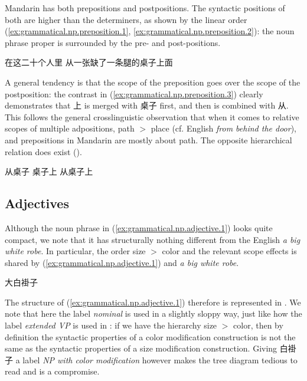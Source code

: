 \documentclass[UTF8, a4paper, oneside, scheme=plain, 12pt]{ctexrep}
\newcommand*{\textgt}{$>$ }
\newcommand*{\term}[1]{\emph{#1}}
\newcommand{\form}[1]{\emph{#1}}
\begin{document}
Mandarin has both prepositions and postpositions.
The syntactic positions of both are higher than the determiners,
as shown by the linear order
(\ref{ex:grammatical.np.preposition.1},
\ref{ex:grammatical.np.preposition.2}):
the noun phrase proper is surrounded by the pre- and post-positions.

\begin{exe}
    \ex\label{ex:grammatical.np.preposition.1} 在这二十个人里
    \ex\label{ex:grammatical.np.preposition.2} 从一张缺了一条腿的桌子上面
\end{exe}

A general tendency is that the scope of the preposition goes over the scope of the postposition:
the contrast in (\ref{ex:grammatical.np.preposition.3})
clearly demonstrates that 上 is merged with 桌子 first, and then is combined with 从.
This follows the general crosslinguistic observation that when it comes to relative scopes of multiple adpositions,
path \textgt{}place (cf. English \form{from behind the door}),
and prepositions in Mandarin are mostly about path.
The opposite hierarchical relation does exist ().

\begin{exe}
    \ex\label{ex:grammatical.np.preposition.3} \begin{xlist}
        \ex *从桌子
        \ex 桌子上
        \ex 从桌子上
    \end{xlist}
\end{exe}

\subsection{Adjectives}\label{sec:grammatical.np.adjectives}

Although the noun phrase in (\ref{ex:grammatical.np.adjective.1}) looks quite compact,
we note that it has structurally nothing different from the English \form{a big white robe}.
In particular, the order size \textgt{}color and the relevant scope effects is shared
by (\ref{ex:grammatical.np.adjective.1}) and \form{a big white robe}.

\begin{exe}
    \ex\label{ex:grammatical.np.adjective.1} 大白褂子
\end{exe}

The structure of (\ref{ex:grammatical.np.adjective.1}) therefore is represented in 
.
We note that here the label \term{nominal} is used in a slightly sloppy way,
just like how the label \term{extended VP} is used in :
if we have the hierarchy size \textgt{}color,
then by definition the syntactic properties of a color modification construction
is not the same as the syntactic properties of a size modification construction.
Giving 白褂子 a label \term{NP with color modification} however makes the tree diagram tedious to read
and  is a compromise.
\end{document}
